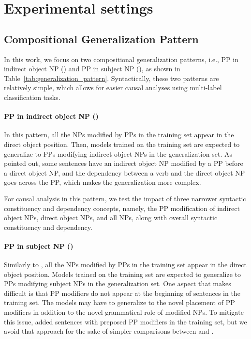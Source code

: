 \section{Experimental settings}
\label{sec:experiment}



\subsection{Compositional Generalization Pattern}
\label{subsec:cg-pattern}

In this work, we focus on two compositional generalization patterns, i.e., PP in indirect object NP (\dobjppiobjpp{}) and PP in subject NP (\dobjppsubjpp{}{}), as shown in Table~\ref{tab:generalization_pattern}.
Syntactically, these two patterns are relatively simple, which allows for easier causal analyses using multi-label classification tasks.

\paragraph{PP in indirect object NP (\dobjppiobjpp{})}
In this pattern, all the NPs modified by PPs in the training set appear in the direct object position.
Then, models trained on the training set are expected to generalize to PPs modifying indirect object NPs in the generalization set.
As \citet{li-etal-2023-slog} pointed out, some sentences have an indirect object NP modified by a PP before a direct object NP, and the dependency between a verb and the direct object NP goes across the PP, which makes the generalization more complex.

For causal analysis in this pattern, we test the impact of three narrower syntactic constituency and dependency concepts, namely, the PP modification of indirect object NPs, direct object NPs, and all NPs, along with overall syntactic constituency and dependency.
\paragraph{PP in subject NP (\dobjppsubjpp{})}
Similarly to \dobjppiobjpp{}, all the NPs modified by PPs in the training set appear in the direct object position.
Models trained on the training set are expected to generalize to PPs modifying subject NPs in the generalization set.
One aspect that makes \dobjppsubjpp{} difficult is that PP modifiers do not appear at the beginning of sentences in the training set.
The models may have to generalize to the novel placement of PP modifiers in addition to the novel grammatical role of modified NPs.
To mitigate this issue, \citet{wu-etal-2023-recogs} added sentences with preposed PP modifiers in the training set, but we avoid that approach for the sake of simpler comparisons between \dobjppiobjpp{} and \dobjppsubjpp{}.


